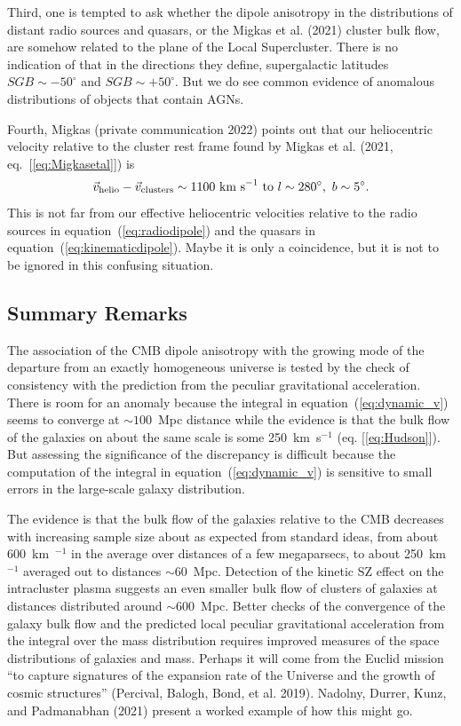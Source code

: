 \documentclass[fleqn,usenatbib]{mnras}
\newcommand{\beq}{\begin{equation}}
\newcommand{\eeq}{\end{equation}}
\begin{document}
Third, one is tempted to ask whether the dipole anisotropy in the distributions of distant radio sources and quasars, or the Migkas et al. (2021) cluster bulk flow, are somehow related to the plane of the Local Supercluster. There is no indication of that in the directions  they define, supergalactic latitudes $SGB\sim -50^\circ$ and $SGB\sim +50^\circ$. But we do see common evidence of anomalous distributions of objects that contain AGNs.

Fourth, Migkas (private communication 2022) points out that our heliocentric velocity relative to the cluster rest frame found by Migkas et al. (2021, eq.~[\ref{eq:Migkasetal}]) is 
\beq
{\vec v}_{\rm helio} - {\vec v}_{\rm clusters}  \sim 1100\hbox{ km s}^{-1}\hbox{ to } l \sim 280^\circ,\ b \sim 5^\circ.\label{eq:Kostas}
\eeq
This is not far from our effective heliocentric velocities relative to the radio sources in equation~(\ref{eq:radiodipole}) and the quasars in equation~(\ref{eq:kinematicdipole}). Maybe it is only a coincidence, but it is not to be ignored in this confusing situation. 

\subsection{Summary Remarks} \label{sec:remarks}

The association of the CMB dipole anisotropy with the growing mode of the departure from an exactly homogeneous universe is tested by the check of consistency with the prediction from the peculiar gravitational acceleration. There is room for an anomaly because the integral  in equation~(\ref{eq:dynamic_v}) seems to converge at $\sim 100$~Mpc distance while the evidence is that the bulk flow of the galaxies on about the same scale is some 250~km~s$^{-1}$ (eq. [\ref{eq:Hudson}]). But assessing the significance of the discrepancy is difficult because the computation of the integral in equation~(\ref{eq:dynamic_v}) is sensitive to small errors in the large-scale galaxy distribution.

The evidence is that the bulk flow of the galaxies relative to the CMB decreases with increasing sample size about as expected from standard ideas, from about 600~km~$^{-1}$ in the average over distances of a few megaparsecs, to about 250~km~$^{-1}$ averaged out to distances $\sim 60$~Mpc. Detection of the kinetic SZ effect on the intracluster plasma suggests an even smaller bulk flow of clusters of galaxies at distances distributed around $\sim 600$~Mpc. Better checks of the convergence of the galaxy bulk flow and the predicted local peculiar gravitational acceleration from the integral over the mass distribution requires improved  measures of the space distributions of galaxies and mass. Perhaps it will come from the Euclid mission ``to capture signatures of the expansion rate of the Universe and the growth of cosmic structures'' (Percival, Balogh, Bond, et al. 2019). Nadolny, Durrer, Kunz, and Padmanabhan (2021) present a worked example of how this might go.
\end{document}
